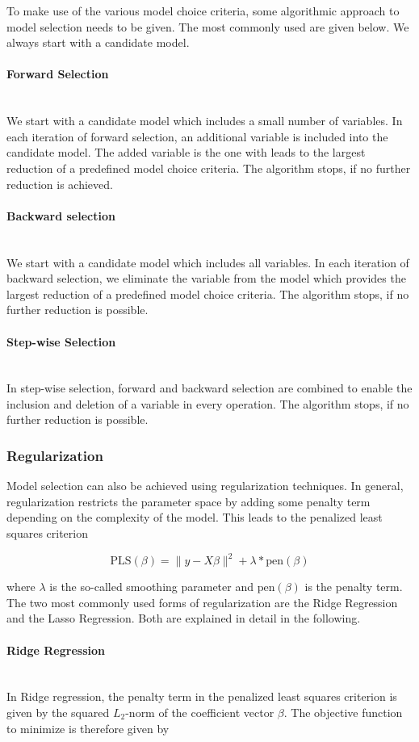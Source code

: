 \documentclass[10pt,a4paper]{article}
\newcommand{\subsubsubsection}[1]{\paragraph{#1}\mbox{}\\}
\begin{document}
To make use of the various model choice criteria, some algorithmic approach to model selection needs to be given. The most commonly used are given below. We always start with a candidate model. \cite{fahrmeir2013regression}

\subsubsubsection{Forward Selection}

We start with a candidate model which includes a small number of variables. In each iteration of forward selection, an additional variable is included into the candidate model.  The added variable is the one with leads to the largest reduction of a predefined model choice criteria. The algorithm stops, if no further reduction is achieved.

\subsubsubsection{Backward selection}

We start with a candidate model which includes all variables. In each iteration of backward selection, we eliminate the variable from the model which provides the largest reduction of a predefined model choice criteria. The algorithm stops, if no further reduction is possible. 

\subsubsubsection{Step-wise Selection}

In step-wise selection, forward and backward selection are combined to enable the inclusion and deletion of a variable in every operation. The algorithm stops, if no further reduction is possible.

\subsubsection{Regularization}

Model selection can also be achieved using regularization techniques. In general, regularization restricts the parameter space by adding some penalty term depending on the complexity of the model. This leads to the penalized least squares criterion

$$\text{PLS}(\beta) = \lVert y - X\beta\rVert^2 + \lambda *\text{pen}(\beta)$$

where $\lambda$ is the so-called smoothing parameter and $\text{pen}(\beta)$ is the penalty term. The two most commonly used forms of regularization are the Ridge Regression and the Lasso Regression. Both are explained in detail in the following.

\subsubsubsection{Ridge Regression}

In Ridge regression, the penalty term in the penalized least squares criterion is given by the squared $L_2$-norm of the coefficient vector $\beta$. The objective function to minimize is therefore given by
\end{document}
